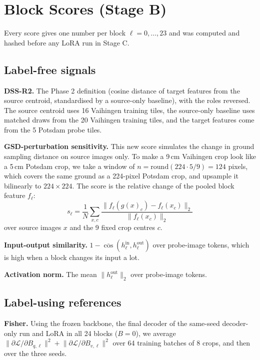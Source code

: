 \documentclass[11pt,a4paper]{report}
\begin{document}
\section{Block Scores (Stage B)}
\label{sec:scores}

Every score gives one number per block $\ell = 0, \dots, 23$ and was computed and hashed before any LoRA run in Stage C.

\subsection{Label-free signals}

\textbf{DSS-R2.} The Phase 2 definition (cosine distance of target features from the source centroid, standardised by a source-only baseline), with the roles reversed. The source centroid uses 16 Vaihingen training tiles, the source-only baseline uses matched draws from the 20 Vaihingen training tiles, and the target features come from the 5 Potsdam probe tiles.

\textbf{GSD-perturbation sensitivity.} This new score simulates the change in ground sampling distance on source images only. To make a 9\,cm Vaihingen crop look like a 5\,cm Potsdam crop, we take a window of $n = \text{round}(224 \cdot 5/9) = 124$ pixels, which covers the same ground as a 224-pixel Potsdam crop, and upsample it bilinearly to $224 \times 224$. The score is the relative change of the pooled block feature $f_\ell$:
\begin{equation}
    s_\ell = \frac{1}{N}\sum_{x,c} \frac{\lVert f_\ell(g(x)_c) - f_\ell(x_c) \rVert_2}{\lVert f_\ell(x_c) \rVert_2}
\end{equation}
over source images $x$ and the 9 fixed crop centres $c$.

\textbf{Input-output similarity.} $1 - \overline{\cos}(h_\ell^{\text{in}}, h_\ell^{\text{out}})$ over probe-image tokens, which is high when a block changes its input a lot.

\textbf{Activation norm.} The mean $\lVert h_\ell^{\text{out}} \rVert_2$ over probe-image tokens.

\subsection{Label-using references}

\textbf{Fisher.} Using the frozen backbone, the final decoder of the same-seed decoder-only run and LoRA in all 24 blocks ($B = 0$), we average $\lVert \partial \mathcal{L} / \partial B_{q,\ell} \rVert^2 + \lVert \partial \mathcal{L} / \partial B_{v,\ell} \rVert^2$ over 64 training batches of 8 crops, and then over the three seeds.
\end{document}
